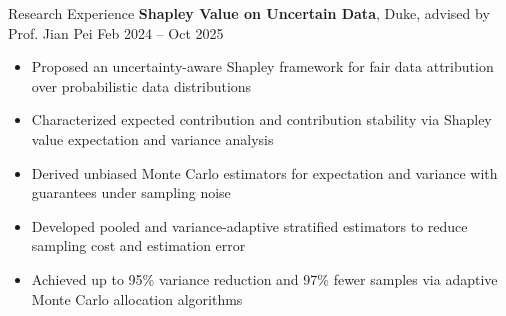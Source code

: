 \documentclass[hidelinks]{resume} %
\begin{document}
\begin{rSection}{R\MakeLowercase{esearch} E\MakeLowercase{xperience}}
\textbf{Shapley Value on Uncertain Data}, Duke, advised by Prof. Jian Pei
\hfill Feb 2024 -- Oct 2025
\vspace{-5pt}
\begin{itemize}
\itemsep -7pt {} 


\item Proposed an uncertainty-aware Shapley framework for fair data attribution over probabilistic data distributions
\item Characterized expected contribution and contribution stability via Shapley value expectation and variance analysis
\item Derived unbiased Monte Carlo estimators for expectation and variance with guarantees under sampling noise
\item Developed pooled and variance-adaptive stratified estimators to reduce sampling cost and estimation error
\item Achieved up to 95\% variance reduction and 97\% fewer samples via adaptive Monte Carlo allocation algorithms


\end{itemize}
\end{rSection}
\end{document}

